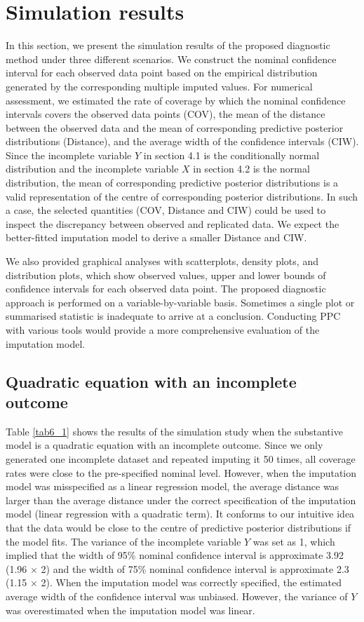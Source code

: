 \documentclass[12pt, fullpage, a4paper]{article}
\begin{document}
\section{Simulation results}
In this section, we present the simulation results of the proposed diagnostic method under three different scenarios. We construct the nominal confidence interval for each observed data point based on the empirical distribution generated by the corresponding multiple imputed values. For numerical assessment, we estimated the rate of coverage by which the nominal confidence intervals covers the observed data points (COV), the mean of the distance between the observed data and the mean of corresponding predictive posterior distributions (Distance), and the average width of the confidence intervals (CIW). Since the incomplete variable $Y$ in section 4.1 is the conditionally normal distribution and the incomplete variable $X$ in section 4.2 is the normal distribution, the mean of corresponding predictive posterior distributions is a valid representation of the centre of corresponding posterior distributions. In such a case, the selected quantities (COV, Distance and CIW) could be used to inspect the discrepancy between observed and replicated data. We expect the better-fitted imputation model to derive a smaller Distance and CIW. 

We also provided graphical analyses with scatterplots, density plots, and distribution plots, which show observed values, upper and lower bounds of confidence intervals for each observed data point. The proposed diagnostic approach is performed on a variable-by-variable basis. Sometimes a single plot or summarised statistic is inadequate to arrive at a conclusion. Conducting PPC with various tools would provide a more comprehensive evaluation of the imputation model.



\subsection{Quadratic equation with an incomplete outcome}
Table \ref{tab6_1} shows the results of the simulation study when the substantive model is a quadratic equation with an incomplete outcome. Since we only generated one incomplete dataset and repeated imputing it 50 times, all coverage rates were close to the pre-specified nominal level. However, when the imputation model was misspecified as a linear regression model, the average distance was larger than the average distance under the correct specification of the imputation model (linear regression with a quadratic term). It conforms to our intuitive idea that the data would be close to the centre of predictive posterior distributions if the model fits. The variance of the incomplete variable $Y$ was set as 1, which implied that the width of 95\% nominal confidence interval is approximate 3.92 (1.96 $\times$ 2) and the width of 75\% nominal confidence interval is approximate 2.3 (1.15 $\times$ 2). When the imputation model was correctly specified, the estimated average width of the confidence interval was unbiased. However, the variance of $Y$ was overestimated when the imputation model was linear. 
\end{document}
